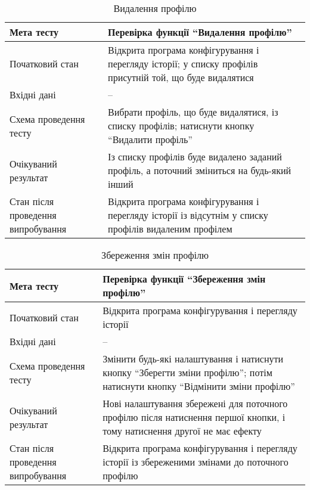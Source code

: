 \small\begin{longtable}{| C{6cm} | C{10cm} |}
  \caption{Видалення профілю}
  \label{table:delete-profile} \\
  \hline
  Мета тесту & Перевірка функції ``Видалення профілю'' \\
  \hline
  Початковий стан
  & Відкрита програма конфігурування і перегляду історії;
  у списку профілів присутній той, що буде видалятися \\
  \hline
  Вхідні дані
  & -- \\
  \hline
  Схема проведення тесту
  & Вибрати профіль, що буде видалятися, із списку профілів;
  натиснути кнопку ``Видалити профіль'' \\
  \hline
  Очікуваний результат
  & Із списку профілів буде видалено заданий профіль,
  а поточний зміниться на будь-який інший \\
  \hline
  Стан після проведення випробування
  & Відкрита програма конфігурування і перегляду історії із
  відсутнім у списку профілів видаленим профілем \\
  \hline
\end{longtable}\normalsize
\newpage
\small\begin{longtable}{| C{6cm} | C{10cm} |}
  \caption{Збереження змін профілю}
  \label{table:save-profile-changes} \\
  \hline
  Мета тесту & Перевірка функції ``Збереження змін профілю'' \\
  \hline
  Початковий стан
  & Відкрита програма конфігурування і перегляду історії \\
  \hline
  Вхідні дані
  & -- \\
  \hline
  Схема проведення тесту
  & Змінити будь-які налаштування і натиснути кнопку ``Зберегти зміни профілю'';
  потім натиснути кнопку ``Відмінити зміни профілю'' \\
  \hline
  Очікуваний результат
  & Нові налаштування збережені для поточного профілю після натиснення першої кнопки,
  і тому натиснення другої не має ефекту \\
  \hline
  Стан після проведення випробування
  & Відкрита програма конфігурування і перегляду історії
  із збереженими змінами до поточного профілю \\
  \hline
\end{longtable}\normalsize

